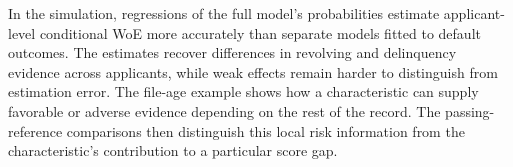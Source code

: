 In the simulation, regressions of the full model's probabilities estimate applicant-level conditional WoE more accurately than separate models fitted to default outcomes. The estimates recover differences in revolving and delinquency evidence across applicants, while weak effects remain harder to distinguish from estimation error. The file-age example shows how a characteristic can supply favorable or adverse evidence depending on the rest of the record. The passing-reference comparisons then distinguish this local risk information from the characteristic's contribution to a particular score gap.
